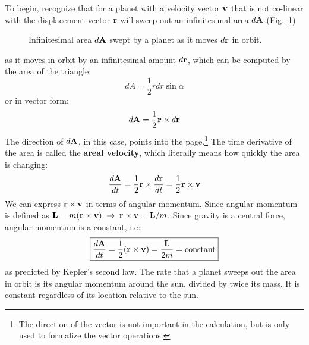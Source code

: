 \documentclass[11pt]{article}
\newcommand{\mb}[1]{
  \ensuremath\mathbf{#1}
}
\begin{document}
To begin, recognize that for a planet with a velocity vector $\mb{v}$ that is
not co-linear with the displacement vector $\mb{r}$ will sweep out an
infinitesimal area $d\mb{A}$ (Fig.~\ref{fig:dA})
\begin{figure}[ht]
  \centering
  \caption{Infinitesimal area $d\mb{A}$ swept by a planet as it moves
    $d\mb{r}$ in orbit.}
  \label{fig:dA}
\end{figure}
as it moves in orbit by an infinitesimal amount $d\mb{r}$, which can be
computed by the area of the triangle:
\begin{equation}
  dA=\frac{1}{2}rdr\sin\alpha
\end{equation}
or in vector form:
\begin{equation}
  d\mb{A}=\frac{1}{2}\mb{r}\times d\mb{r}
\end{equation}
The direction of $d\mb{A}$, in this case, points into the
page.\footnote{The direction of the vector is not important in the calculation,
  but is only used to formalize the vector operations.} The time derivative of
the area is called the \textbf{areal velocity}, which literally means how
quickly the area is changing:
\begin{equation}
  \frac{d\mb{A}}{dt}
  =\frac{1}{2}\mb{r}\times\frac{d\mb{r}}{dt}
  =\frac{1}{2}\mb{r}\times\mb{v}
\end{equation}
We can express $\mb{r}\times\mb{v}$ in terms of angular momentum. Since angular
momentum is defined as $\mb{L}=m(\mb{r}\times\mb{v})\;\rightarrow\;
\mb{r}\times\mb{v}=\mb{L}/m$. Since gravity is a central force, angular
momentum is a constant, i.e:
\begin{equation}
  \boxed{\frac{d\mb{A}}{dt}
    =\frac{1}{2}(\mb{r}\times\mb{v})=\frac{\mb{L}}{2m}=
    \text{constant}
  }
  \label{constant}
\end{equation}
as predicted by Kepler's second law. The rate that a planet sweeps out the area
in orbit is its angular momentum around the sun, divided by twice its mass. It
is constant regardless of its location relative to the sun.
\end{document}
